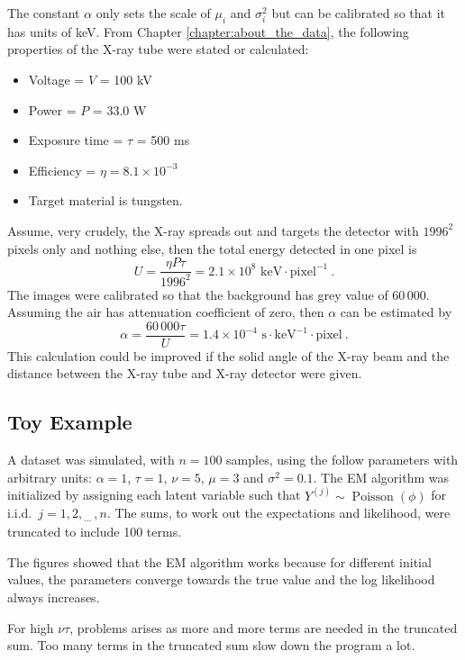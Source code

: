 \documentclass[12pt]{report}
\DeclareMathOperator{\poisson}{Poisson}
\newcommand{\dotdotdot}{_{\phantom{.}\cdots}}
\begin{document}
The constant $\alpha$ only sets the scale of $\mu_i$ and $\sigma_i^2$ but can be calibrated so that it has units of keV. From Chapter \ref{chapter:about_the_data}, the following properties of the X-ray tube were stated or calculated:
\begin{itemize}
	\item Voltage = $V$ = 100 kV
	\item Power = $P$ = 33.0 W
	\item Exposure time = $\tau$ = 500 ms
	\item Efficiency = $\eta = 8.1\times10^{-3}$
	\item Target material is tungsten.
\end{itemize}
Assume, very crudely, the X-ray spreads out and targets the detector with $1996^2$ pixels only and nothing else, then the total energy detected in one pixel is
\begin{equation}
U=\frac{\eta P\tau}{1996^2}=2.1\times10^{8}\text{ keV}\cdot\text{pixel}^{-1} \ .
\end{equation}
The images were calibrated so that the background has grey value of 60\,000. Assuming the air has attenuation coefficient of zero, then $\alpha$ can be estimated by
\begin{equation}
\alpha = \frac{60\,000 \tau}{U} = 1.4\times10^{-4}\text{ s}\cdot\text{keV}^{-1}\cdot\text{pixel} \ .
\end{equation}
This calculation could be improved if the solid angle of the X-ray beam and the distance between the X-ray tube and X-ray detector were given.

\subsection{Toy Example}
A dataset was simulated, with $n=100$ samples, using the follow parameters with arbitrary units: $\alpha=1$, $\tau=1$, $\nu=5$, $\mu=3$ and $\sigma^2=0.1$. The EM algorithm was initialized by assigning each latent variable such that $Y^{(j)}\sim\poisson(\phi)$ for i.i.d.~$j=1,2,\dotdotdot,n$. The sums, to work out the expectations and likelihood, were truncated to include 100 terms.

The figures showed that the EM algorithm works because for different initial values, the parameters converge towards the true value and the log likelihood always increases.

For high $\nu\tau$, problems arises as more and more terms are needed in the truncated sum. Too many terms in the truncated sum slow down the program a lot.
\end{document}
